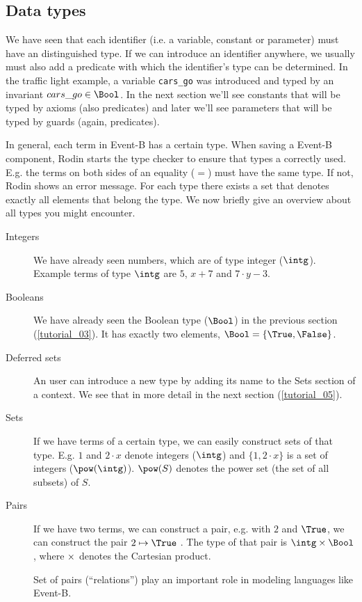 \subsection{Data types}
\label{tut04:types}
We have seen that each identifier (i.e. a variable, constant or parameter) must have an distinguished type.
If we can introduce an identifier anywhere, we usually must also add a predicate with which the
identifier's type can be determined. In the traffic light example, a variable \texttt{cars\_go} was
introduced and typed by an invariant $cars\_go \in \Bool$. In the next section we'll see constants that
will be typed by axioms (also predicates) and later we'll see parameters that will be typed by guards (again, predicates).

In general, each term in Event-B has a certain type. 
When saving a Event-B component, Rodin starts the type checker to ensure that types a correctly used.
E.g. the terms on both sides of an equality ($=$) must have the same type. If not, Rodin shows an error message.
For each type there exists a set that denotes exactly all elements that belong the type. We now briefly
give an overview about all types you might encounter.

\begin{description}
\item[Integers] 
  We have already seen numbers, which are of type integer ($\intg$).
  Example terms of type $\intg$ are $5$, $x+7$ and $7 \cdot y - 3$.
\item[Booleans] 
  We have already seen the Boolean type ($\Bool$) in the previous section (\ref{tutorial_03}).
  It has exactly two elements, $\Bool = \{\True,\False\}$.
\item[Deferred sets] 
  An user can introduce a new type by adding its name to the
  \textsf{Sets} section of a context. We see that in more detail in the next section (\ref{tutorial_05}).
\item[Sets]
  If we have terms of a certain type, we can easily construct sets of that type.
  E.g. $1$ and $2\cdot x$ denote integers ($\intg$) and $\{1,2\cdot x\}$ is a set of integers ($\pow(\intg)$).
  $\pow(S)$  denotes the power set (the set of all subsets) of $S$.
\item[Pairs] 
  If we have two terms, we can construct a pair, e.g. with $2$ and $\True$, we
  can construct the pair $2\mapsto\True$ .
  The type of that pair is $\intg\cprod\Bool$, where $\mathbin\times$ denotes the Cartesian product.

  Set of pairs (``relations'') play an important role in modeling languages like Event-B.
\end{description}

